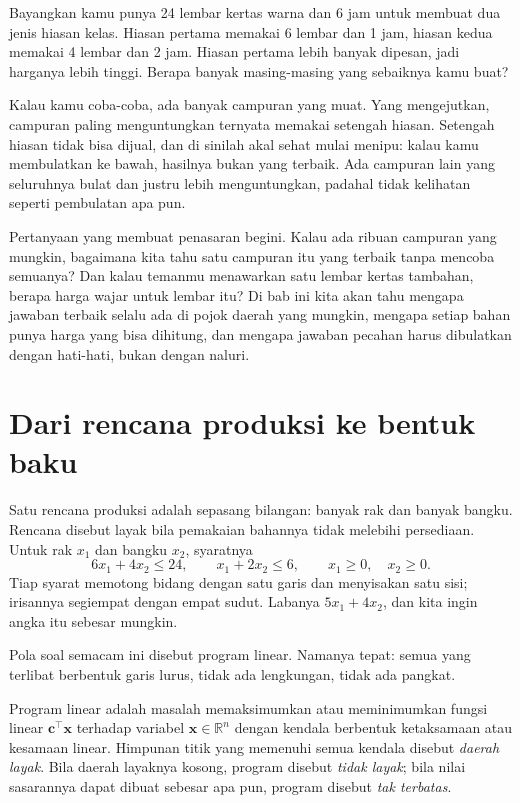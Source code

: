\begin{untukanak}
Bayangkan kamu punya 24 lembar kertas warna dan 6 jam untuk membuat dua jenis hiasan
kelas. Hiasan pertama memakai 6 lembar dan 1 jam, hiasan kedua memakai 4 lembar dan 2 jam.
Hiasan pertama lebih banyak dipesan, jadi harganya lebih tinggi. Berapa banyak masing-masing
yang sebaiknya kamu buat?

Kalau kamu coba-coba, ada banyak campuran yang muat. Yang mengejutkan, campuran paling
menguntungkan ternyata memakai setengah hiasan. Setengah hiasan tidak bisa dijual, dan di
sinilah akal sehat mulai menipu: kalau kamu membulatkan ke bawah, hasilnya bukan yang
terbaik. Ada campuran lain yang seluruhnya bulat dan justru lebih menguntungkan, padahal
tidak kelihatan seperti pembulatan apa pun.

Pertanyaan yang membuat penasaran begini. Kalau ada ribuan campuran yang mungkin, bagaimana
kita tahu satu campuran itu yang terbaik tanpa mencoba semuanya? Dan kalau temanmu
menawarkan satu lembar kertas tambahan, berapa harga wajar untuk lembar itu? Di bab ini
kita akan tahu mengapa jawaban terbaik selalu ada di pojok daerah yang mungkin, mengapa
setiap bahan punya harga yang bisa dihitung, dan mengapa jawaban pecahan harus dibulatkan
dengan hati-hati, bukan dengan naluri.
\end{untukanak}

\section{Dari rencana produksi ke bentuk baku}

Satu rencana produksi adalah sepasang bilangan: banyak rak dan banyak bangku. Rencana
disebut layak bila pemakaian bahannya tidak melebihi persediaan. Untuk rak $x_{1}$ dan
bangku $x_{2}$, syaratnya
\[
  6x_{1}+4x_{2}\le24,\qquad x_{1}+2x_{2}\le6,\qquad x_{1}\ge0,\quad x_{2}\ge0 .
\]
Tiap syarat memotong bidang dengan satu garis dan menyisakan satu sisi; irisannya segiempat
dengan empat sudut. Labanya $5x_{1}+4x_{2}$, dan kita ingin angka itu sebesar mungkin.

Pola soal semacam ini disebut program linear. Namanya tepat: semua yang terlibat berbentuk
garis lurus, tidak ada lengkungan, tidak ada pangkat.


\begin{definisi}
Program linear adalah masalah memaksimumkan atau meminimumkan fungsi linear
$\mathbf{c}^{\top}\mathbf{x}$ terhadap variabel $\mathbf{x}\in\mathbb{R}^{n}$ dengan
kendala berbentuk ketaksamaan atau kesamaan linear. Himpunan titik yang memenuhi semua
kendala disebut \emph{daerah layak}. Bila daerah layaknya kosong, program disebut
\emph{tidak layak}; bila nilai sasarannya dapat dibuat sebesar apa pun, program disebut
\emph{tak terbatas}.
\end{definisi}

